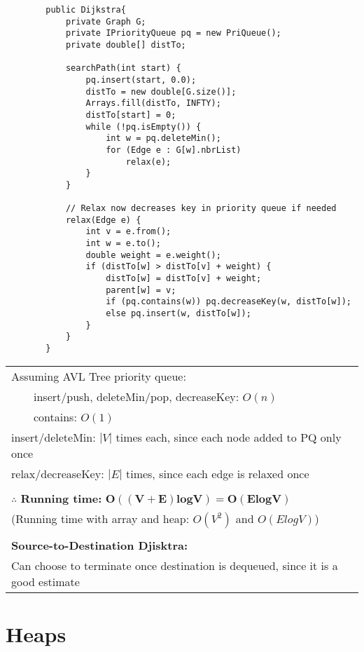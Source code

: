 \documentclass{article}
\newcommand{\tabitem}{~~\llap{\textbullet}~~}
\begin{document}
    \begin{verbatim}
        public Dijkstra{
            private Graph G;
            private IPriorityQueue pq = new PriQueue();
            private double[] distTo;

            searchPath(int start) {
                pq.insert(start, 0.0);
                distTo = new double[G.size()];
                Arrays.fill(distTo, INFTY);
                distTo[start] = 0;
                while (!pq.isEmpty()) {
                    int w = pq.deleteMin();
                    for (Edge e : G[w].nbrList)
                        relax(e);
                }
            }

            // Relax now decreases key in priority queue if needed
            relax(Edge e) {
                int v = e.from();
                int w = e.to();
                double weight = e.weight();
                if (distTo[w] > distTo[v] + weight) {
                    distTo[w] = distTo[v] + weight;
                    parent[w] = v;
                    if (pq.contains(w)) pq.decreaseKey(w, distTo[w]);
                    else pq.insert(w, distTo[w]);
                }
            }
        }
    \end{verbatim}
        
    \begin{tabular}{l}
        Assuming AVL Tree priority queue:\\
        \tabitem insert/push, deleteMin/pop, decreaseKey: $O(n)$\\
        \tabitem contains: $O(1)$\\
        insert/deleteMin: $|V|$ times each, since each node added to PQ only once\\
        relax/decreaseKey: $|E|$ times, since each edge is relaxed once\\\\
        $\therefore$\textbf{ Running time: }$\bm{O((V+E)logV) = O(ElogV)}$\\
        (Running time with array and heap: $O(V^{2})$ and $O(ElogV)$)\\\\
        \textbf{Source-to-Destination Djisktra: }\\
        Can choose to terminate once destination is dequeued, since it is a good estimate\\
    \end{tabular}

    \section{Heaps}
\end{document}
